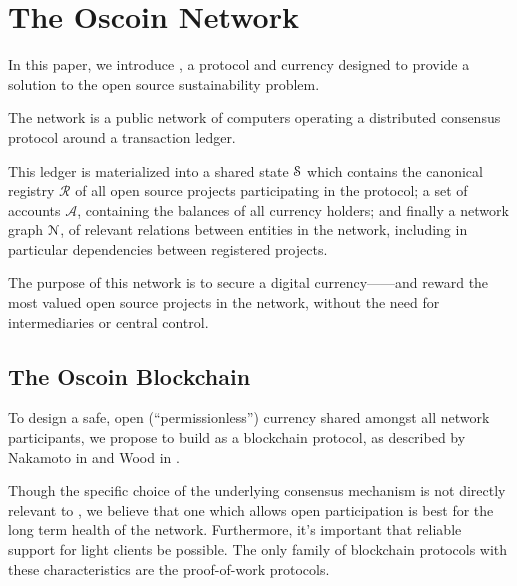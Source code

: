 \section{The Oscoin Network}
\label{s:oscoin}



\noindent In this paper, we introduce \oscoin{}, a protocol and currency
designed to provide a solution to the open source sustainability problem.

The \oscoin{} network is a public network of computers operating a distributed
consensus protocol around a transaction ledger.


This ledger is materialized into a shared state $\mathcal{S}$ which
contains the canonical registry $\mathcal{R}$ of all open source
projects participating in the \oscoin{} protocol; a set of accounts
$\mathcal{A}$, containing the balances of all currency holders; and
finally a network graph $\mathcal{N}$, of relevant relations between
entities in the network, including in particular dependencies between
registered projects.

The purpose of this network is to secure a digital currency---\oscoin{}---and
reward the most valued open source projects in the network, without the need
for intermediaries or central control.

\subsection{The Oscoin Blockchain}

To design a safe, open (``permissionless'') currency shared amongst all network
participants, we propose to build \oscoin{} as a blockchain protocol, as
described by Nakamoto in \cite{bitcoin} and Wood in \cite{ethereum}.

Though the specific choice of the underlying consensus mechanism is not
directly relevant to \oscoin{}, we believe that one which allows open
participation is best for the long term health of the network. Furthermore,
it's important that reliable support for light clients be possible. The only
family of blockchain protocols with these characteristics are the proof-of-work
protocols.

